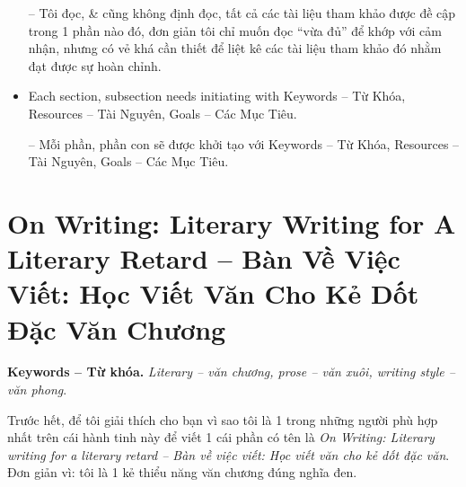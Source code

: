 \documentclass[12pt,oneside]{book}
\begin{document}
\begin{itemize}
	-- Tôi đọc, \& cũng không định đọc, tất cả các tài liệu tham khảo được đề cập trong 1 phần nào đó, đơn giản tôi chỉ muốn đọc ``vừa đủ'' để khớp với cảm nhận, nhưng có vẻ khá cần thiết để liệt kê các tài liệu tham khảo đó nhằm đạt được sự hoàn chỉnh.
	\item Each section, subsection needs initiating with {\sf Keywords -- Từ Khóa, Resources -- Tài Nguyên, Goals -- Các Mục Tiêu}.
	
	-- Mỗi phần, phần con sẽ được khởi tạo với {\sf Keywords -- Từ Khóa, Resources -- Tài Nguyên, Goals -- Các Mục Tiêu}.
\end{itemize}

\chapter{On Writing: Literary Writing for A Literary Retard -- Bàn Về Việc Viết: Học Viết Văn Cho Kẻ Dốt Đặc Văn Chương}
\minitoc
{\bf \textsf{Keywords -- Từ khóa.}} {\it Literary -- văn chương, prose -- văn xuôi, writing style -- văn phong}.

Trước hết, để tôi giải thích cho bạn vì sao tôi là 1 trong những người phù hợp nhất trên cái hành tinh này để viết 1 cái phần có tên là {\it On Writing: Literary writing for a literary retard -- Bàn về việc viết: Học viết văn cho kẻ dốt đặc văn}. Đơn giản vì: tôi là 1 kẻ thiểu năng văn chương đúng nghĩa đen.
\end{document}
